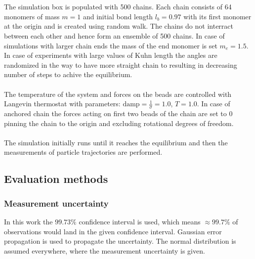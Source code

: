\documentclass[
    paper=A4,pagesize=automedia,fontsize=12pt,
    BCOR=15mm,DIV=22,
    twoside,headinclude,footinclude=false,
    fleqn,             %
    bibliography=totocnumbered,          %
    listof=totoc,                %
    listof=flat,                 %
    cleardoublepage=empty      %
    numbers=endperiod
]{scrartcl}
\begin{document}
\\
\\
The simulation box is populated with 500 chains. Each chain consists of 64 monomers of mass $m=1$
and initial bond length $l_b=0.97$ with its first monomer at the origin
and is created using random walk. 
The chains do not interract between each other and hence form
an ensemble of 500 chains. In case of simulations with larger chain ends 
the mass of the end monomer
is set $m_e=1.5$. In case of experiments with large values of Kuhn length the 
angles are randomized in 
the way to have more straight chain to resulting in decreasing number of 
steps to achive the equilibrium.
\\
\\
The temperature of the system and forces on the beads are controlled with
Langevin thermostat with parameters: $\text{damp}=\frac{1}{\sigma}=1.0$, $T=1.0$. In case of anchored
chain the forces acting on first two beads of the chain are set to 0 pinning the chain to the origin
and excluding rotational degrees of freedom.
\\
\\
The simulation initially runs until it reaches the equilibrium and then the measurements
of particle trajectories are performed. 

\subsection{Evaluation methods}

\subsubsection{Measurement uncertainty}
In this work the $99.73 \%$ confidence interval is used, which means
$\approx99.7 \%$ of observations would land in the given confidence interval.
Gaussian error propagation is used to propagate the uncertainty. The normal
distribution is assumed everywhere, where the measurement uncertainty is given.
\end{document}
